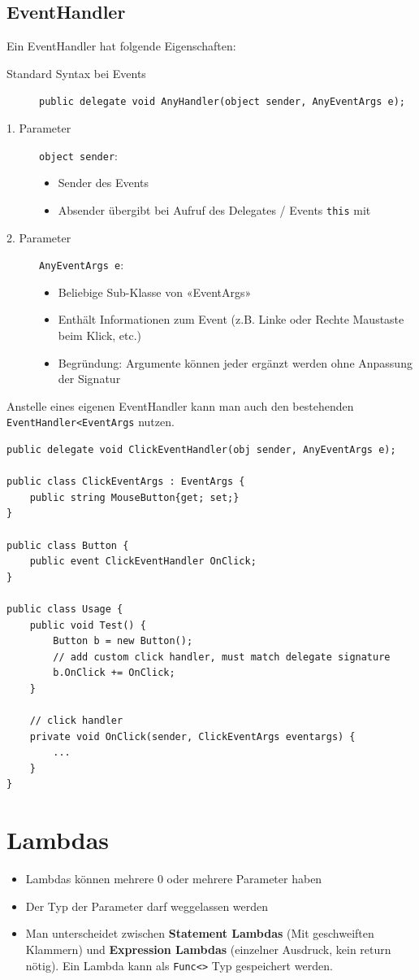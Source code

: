 \documentclass[
a4paper,
oneside,
10pt,
fleqn,
headsepline,
toc=listofnumbered, 
bibliography=totocnumbered]{scrartcl}
\let\stdsection\section
\renewcommand\section{\clearpage\stdsection}
\begin{document}
\subsection{EventHandler}
Ein EventHandler hat folgende Eigenschaften:
\begin{description}
	\item[Standard Syntax bei Events] \lstinline|public delegate void AnyHandler(object sender, AnyEventArgs e); |
	\item [1. Parameter] \lstinline|object sender|:
	      \begin{itemize}
		      \item Sender des Events
		      \item Absender übergibt bei Aufruf des Delegates / Events \lstinline|this| mit
	      \end{itemize}
	\item [2. Parameter] \lstinline|AnyEventArgs e|:
	      \begin{itemize}
		      \item Beliebige Sub-Klasse von «EventArgs»
		      \item Enthält Informationen zum Event (z.B. Linke oder Rechte Maustaste beim Klick, etc.)
		      \item Begründung: Argumente können jeder ergänzt werden ohne Anpassung der Signatur
	      \end{itemize}
\end{description}

Anstelle eines eigenen EventHandler kann man auch den bestehenden \lstinline|EventHandler<EventArgs| nutzen.
\begin{lstlisting}[caption=C\# Event Handler]
public delegate void ClickEventHandler(obj sender, AnyEventArgs e);

public class ClickEventArgs : EventArgs {
	public string MouseButton{get; set;}
}

public class Button {
	public event ClickEventHandler OnClick;
}

public class Usage {
	public void Test() {
		Button b = new Button();
		// add custom click handler, must match delegate signature
		b.OnClick += OnClick;
	}
	
	// click handler
	private void OnClick(sender, ClickEventArgs eventargs) {
		...
	}
}
\end{lstlisting}

\section{Lambdas}
\begin{itemize}
	\item Lambdas können mehrere 0 oder mehrere Parameter haben
	\item Der Typ der Parameter darf weggelassen werden
	\item Man unterscheidet zwischen \textbf{Statement Lambdas} (Mit geschweiften Klammern) und \textbf{Expression Lambdas} (einzelner Ausdruck, kein return nötig). Ein Lambda kann als \lstinline|Func<>| Typ gespeichert werden.
\end{itemize}
\end{document}
